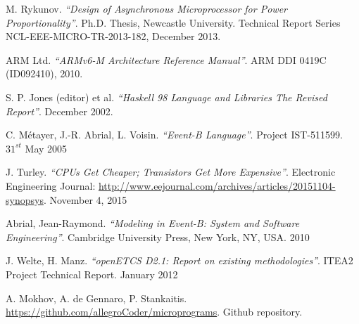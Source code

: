 \documentclass[conference]{IEEEtran}
\begin{document}
\begin{thebibliography}{10}
	M. Rykunov. \emph{``Design of Asynchronous Microprocessor for Power
	Proportionality''}. Ph.D. Thesis, Newcastle University. Technical Report Series
	NCL-EEE-MICRO-TR-2013-182, December 2013.
	
	ARM Ltd. \emph{``ARMv6-M Architecture Reference Manual''}. 
	ARM DDI 0419C (ID092410), 2010.
	
	S. P. Jones (editor) et al.
	\emph{``Haskell 98 Language and Libraries The Revised Report''}.
	December 2002.
	
	C. Métayer, J.-R. Abrial, L. Voisin. \emph{``Event-B Language''}. 
	Project IST-511599. $31^{st}$ May 2005
	
	J. Turley. \emph{``CPUs Get Cheaper; Transistors Get More Expensive''}. Electronic
	Engineering Journal: \url{http://www.eejournal.com/archives/articles/20151104-synopsys}.
	November 4, 2015
	
    Abrial, Jean-Raymond. \emph{``Modeling in Event-B: System and Software Engineering''}.
    Cambridge University Press, New York, NY, USA.
    2010
    
	J. Welte, H. Manz. \emph{``openETCS D2.1: Report on existing methodologies''}.
	ITEA2 Project Technical Report.
	January 2012
	
	A. Mokhov, A. de Gennaro, P. Stankaitis. \url{https://github.com/allegroCoder/microprograms}. Github repository.
    
\end{thebibliography}
\end{document}
